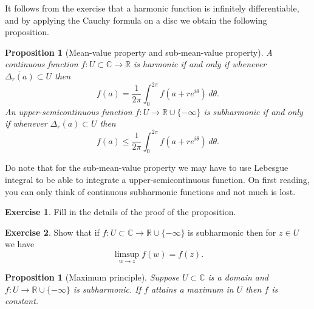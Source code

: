\documentclass[12pt,openany]{book}
\newcommand{\C}{{\mathbb{C}}}
\newcommand{\R}{{\mathbb{R}}}
\theoremstyle{plain}
\newtheorem{prop}[thm]{Proposition}
\theoremstyle{remark}
\theoremstyle{definition}
\newenvironment{exbox}{%
    \def\FrameCommand{\vrule width 1pt \relax\hspace {10pt}}%
    \MakeFramed {\advance \hsize -\width \FrameRestore }%
}{%
    \endMakeFramed
}
\theoremstyle{exercise}
\newtheorem{exercise}{Exercise}[section]
\theoremstyle{example}
\begin{document}
It follows from the exercise that
a harmonic function is infinitely differentiable, and by 
applying
the Cauchy formula on a disc we obtain the following proposition.

\begin{prop}[Mean-value property and sub-mean-value property]
A continuous function
$f \colon U \subset \C \to \R$
is harmonic if and only if whenever 
$\overline{\Delta_r(a)} \subset U$ then
\begin{equation*}
f(a) = \frac{1}{2\pi} \int_0^{2\pi} f(a+re^{i\theta})\, d\theta .
\end{equation*}
An upper-semicontinuous function $f \colon U \to \R \cup \{ -\infty \}$
is subharmonic if and only if whenever
$\overline{\Delta_r(a)} \subset U$ then
\begin{equation*}
f(a) \leq \frac{1}{2\pi} \int_0^{2\pi} f(a+re^{i\theta})\, d\theta .
\end{equation*}
\end{prop}

Do note that for the sub-mean-value property we may have to use 
Lebesgue integral to be able to integrate a upper-semicontinuous function.
On first reading, you can only think of continuous subharmonic
functions and not much is lost.

\begin{exbox}
\begin{exercise}
Fill in the details of the proof of the proposition.
\end{exercise}

\begin{exercise}
Show that if $f \colon U \subset \C \to \R \cup\{- \infty \}$ is subharmonic
then for $z \in U$ we have
\begin{equation*}
\limsup_{w \to z} f(w) = f(z) .
\end{equation*}
\end{exercise}
\end{exbox}

\begin{prop}[Maximum principle]
Suppose $U \subset \C$ is a domain and $f \colon U \to \R \cup \{ -\infty \}$
is subharmonic.  If $f$ attains a maximum in $U$ then $f$ is constant.
\end{prop}
\end{document}
